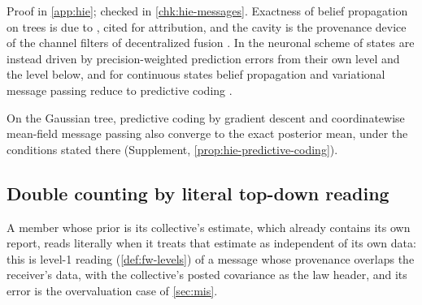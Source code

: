 Proof in \cref{app:hie}; checked in \cref{chk:hie-messages}. Exactness of belief propagation on trees is due to \citet{pearl1988probabilistic}, cited for attribution, and the cavity is the provenance device of the channel filters of decentralized fusion \citep{grime1994data}. In the neuronal scheme of \citet{friston2008hierarchical} states are instead driven by precision-weighted prediction errors from their own level and the level below, and for continuous states belief propagation and variational message passing reduce to predictive coding \citep{friston2017graphical}.

On the Gaussian tree, predictive coding by gradient descent and coordinatewise mean-field message passing also converge to the exact posterior mean, under the conditions stated there (Supplement, \cref{prop:hie-predictive-coding}).

\subsection{Double counting by literal top-down reading}\label{sec:hie-literal}

A member whose prior is its collective's estimate, which already contains its own report, reads literally when it treats that estimate as independent of its own data: this is level-1 reading (\cref{def:fw-levels}) of a message whose provenance overlaps the receiver's data, with the collective's posted covariance as the law header, and its error is the overvaluation case of \cref{sec:mis}.

